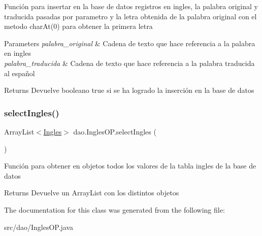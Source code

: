 Función para insertar en la base de datos registros en ingles, la palabra original y traducida pasadas por parametro y la letra obtenida de la palabra original con el metodo char\+At(0) para obtener la primera letra 
\begin{DoxyParams}{Parameters}
{\em palabra\+\_\+original} & Cadena de texto que hace referencia a la palabra en ingles \\
\hline
{\em palabra\+\_\+traducida} & Cadena de texto que hace referencia a la palabra traducida al español \\
\hline
\end{DoxyParams}
\begin{DoxyReturn}{Returns}
Devuelve booleano true si se ha logrado la inserción en la base de datos 
\end{DoxyReturn}
\mbox{\label{classdao_1_1_ingles_o_p_a2ca6d784eb05b7ef5dfbbe9778778aaa}} 
\subsubsection{\texorpdfstring{selectIngles()}{selectIngles()}}
{\footnotesize\ttfamily Array\+List$<$\mbox{\hyperlink{classvo_1_1_ingles}{Ingles}}$>$ dao.\+Ingles\+O\+P.\+select\+Ingles (\begin{DoxyParamCaption}{ }\end{DoxyParamCaption})\hspace{0.3cm}{\ttfamily [inline]}}

Función para obtener en objetos todos los valores de la tabla ingles de la base de datos \begin{DoxyReturn}{Returns}
Devuelve un Array\+List con los distintos objetos 
\end{DoxyReturn}


The documentation for this class was generated from the following file\+:\begin{DoxyCompactItemize}
\item 
src/dao/Ingles\+O\+P.\+java\end{DoxyCompactItemize}
